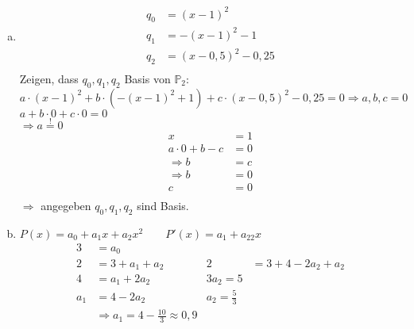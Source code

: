 \documentclass[11pt,a4paper]{article}
\begin{document}
      \begin{enumerate}[a)]
        \item
        \begin{align*}
            q_0&=(x-1)^2\\
            q_1&=-(x-1)^2-1\\
            q_2&=(x-0,5)^2-0,25\\
        \end{align*}
        Zeigen, dass $q_0,q_1,q_2$ Basis von $\mathbb{P}_2$:\\
        $a\cdot(x-1)^2+b\cdot\left(-(x-1)^2+1\right)+c\cdot(x-0,5)^2-0,25=0\Rightarrow a,b,c=0$\\
        $a+b\cdot 0+c\cdot 0=0$\\
        $\Rightarrow a\stackrel{!}{=}0$\\
        \begin{align*}
          x&=1\\
          a\cdot 0+b-c&=0\\
          \Rightarrow b&=c\\
          \Rightarrow b&=0\\
          c&=0\\
        \end{align*}
        $\Rightarrow$ angegeben $q_0,q_1,q_2$ sind Basis.
        \item
        $P(x)=a_0+a_1x+a_2x^2\qquad P'(x)=a_1+a_22x$\\
        \begin{align*}
          3&=a_0\\
          2&=3+a_1+a_2 & 2&=3+4-2a_2+a_2\\
          4&=a_1+2a_2 & 3a_2=5\\
          a_1&=4-2a_2 & a_2=\frac{5}{3}\\
          &\Rightarrow a_1=4-\frac{10}{3}\approx 0,9
        \end{align*}
      \end{enumerate}
\end{document}
